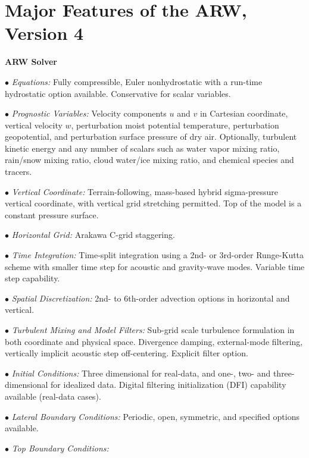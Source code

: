 \section {Major Features of the ARW, Version 4}

\vskip 12pt
{\noindent\bf ARW Solver}
\vskip 12pt

\begin{description}
\setlength{\itemsep}{-5pt}
\item{$\bullet$} {\em Equations:}
Fully compressible, Euler nonhydrostatic with 
a run-time hydrostatic option available. Conservative for scalar variables.
%
\item{$\bullet$} {\em Prognostic Variables:}
Velocity components $u$ and $v$ in Cartesian coordinate, vertical velocity $w$, 
perturbation moist potential temperature, perturbation geopotential, 
and perturbation surface pressure of dry air.
Optionally, turbulent kinetic energy and any number of scalars
such as water vapor mixing ratio, rain/snow mixing ratio,
cloud water/ice mixing ratio, and chemical species and tracers.
%
\item{$\bullet$} {\em Vertical Coordinate:}
Terrain-following, mass-based hybrid sigma-pressure vertical coordinate, with 
vertical grid stretching permitted.  Top of the model is a constant 
pressure surface.
%
\item{$\bullet$} {\em Horizontal Grid:}
Arakawa C-grid staggering. 
%
\item{$\bullet$} {\em Time Integration:}
Time-split integration using a 2nd- or 3rd-order Runge-Kutta scheme with
smaller time step for acoustic and gravity-wave modes. 
Variable time step capability.
%
\item{$\bullet$} {\em Spatial Discretization:}
2nd- to 6th-order advection options in horizontal and vertical.
%
\item{$\bullet$} {\em Turbulent Mixing and Model Filters:} Sub-grid scale
turbulence formulation in both coordinate and physical space.
Divergence damping, external-mode filtering, vertically implicit
acoustic step off-centering. Explicit filter option.
%
\item{$\bullet$} {\em Initial Conditions:}
Three dimensional for real-data, and one-, two- and 
three-dimensional for idealized data. 
Digital filtering initialization (DFI) capability 
available (real-data cases).
%
\item{$\bullet$} {\em Lateral Boundary Conditions:} 
Periodic, open, symmetric, and specified options available.
%
\item{$\bullet$} {\em Top Boundary Conditions:} 

\end{description}
